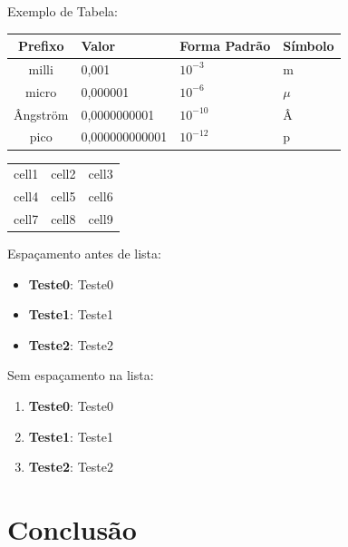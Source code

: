 \documentclass[a4paper,11pt]{article}
\begin{document}
Exemplo de Tabela:
\begin{table}[H]
	\centering 
	\begin{tabular}{c | L{3cm} | C{3cm} | R{3cm} }
		\textbf{Prefixo} & \textbf{Valor} & \textbf{Forma Padrão} & \textbf{Símbolo} \\
		\hline
		milli & 0,001 & $10^{-3}$ & m \\
		micro & 0,000001 & $10^{-6}$ & $\mu$ \\
		Ângström & 0,0000000001 & $10^{-10}$ & Â \\
		pico & 0,000000000001 & $10^{-12}$ & p \\
	\end{tabular}
\end{table}

\begin{center}
	\begin{tabular}{ c|c|c } 
		\hline
		cell1 & cell2 & cell3 \\ 
		cell4 & cell5 & cell6 \\ 
		cell7 & cell8 & cell9 \\ 
		\hline
	\end{tabular}
\end{center}

Espaçamento antes de lista: \vspace{-1em}
\begin{itemize}
	\item \textbf{Teste0}: Teste0
    \item \textbf{Teste1}: Teste1
    \item \textbf{Teste2}: Teste2
\end{itemize}

Sem espaçamento na lista:

\begin{enumerate}[nolistsep]
	\item \textbf{Teste0}: Teste0
	\item \textbf{Teste1}: Teste1
	\item \textbf{Teste2}: Teste2
\end{enumerate}


\section{Conclusão}



\begin{thebibliography}{3}
	
\end{thebibliography}
\end{document}
